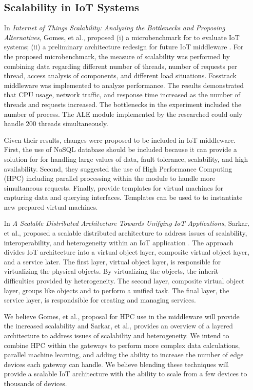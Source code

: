 \documentclass[../main.tex]{subfiles}
\begin{document}
\subsection{Scalability in IoT Systems}
In \textit{Internet of Things Scalability: Analyzing the Bottlenecks and Proposing Alternatives}, Gomes, et al., proposed (i) a microbenchmark for to evaluate IoT systems; (ii) a preliminary architecture redesign for future IoT middleware \cite{7002114}. For the proposed microbenchmark, the measure of scalability was performed by combining data regarding different number of threads, number of requests per thread, access analysis of components, and different load situations. Fosstrack middleware was implemented to analyze performance. The results demonstrated that CPU usage, network traffic, and response time increased as the number of threads and requests increased. The bottlenecks in the experiment included the number of process. The ALE module implemented by the researched could only handle 200 threads simultaneously. 

Given their results, changes were proposed to be included in IoT middleware. First, the use of NoSQL database should be included because it can provide a solution for for handling large values of data, fault tolerance, scalability, and high availability. Second, they suggested the use of High Performance Computing (HPC) including parallel processing within the module to handle more simultaneous requests. Finally, provide templates for virtual machines for capturing data and querying interfaces. Templates can be used to to instantiate new prepared virtual machines. 

In \textit{A Scalable Distributed Architecture Towards Unifying IoT Applications}, Sarkar, et al., proposed a scalable distributed architecture to address issues of scalability, interoperability, and heterogeneity within an IoT application \cite{6803220}. The approach divides IoT architecture into a virtual object layer, composite virtual object layer, and a service later. The first layer, virtual object layer, is responsible for virtualizing the physical objects. By virtualizing the objects, the inherit difficulties provided by heterogeneity. The second layer, composite virtual object layer, groups like objects and to perform a unified task. The final layer, the service layer, is respondsible for creating and managing services. 

We believe Gomes, et al., proposal for HPC use in the middleware will provide the increased scalability and Sarkar, et al., provides an overview of a layered architecture to address issues of scalability and heterogeneity. We intend to combine HPC within the gateways to perform more complex data calculations, parallel machine learning, and adding the ability to increase the number of edge devices each gateway can handle. We believe blending these techniques will provide a scalable IoT architecture with the ability to scale from a few devices to thousands of devices.
\end{document}
